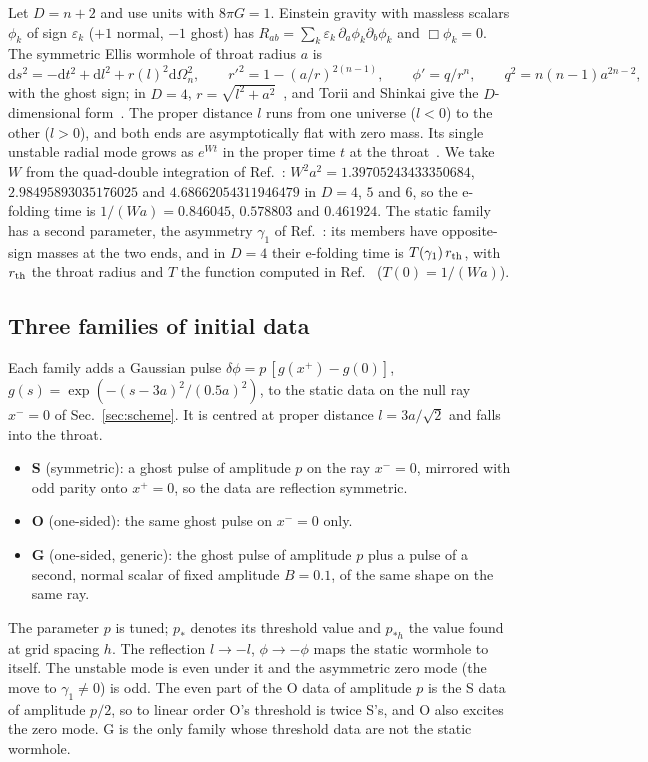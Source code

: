 \documentclass[11pt]{article}
\newcommand{\dd}{\mathrm{d}}
\newcommand{\pst}{p_{*h}}
\begin{document}
Let $D=n+2$ and use units with $8\pi G=1$. Einstein gravity with massless scalars $\phi_k$ of sign $\varepsilon_k$
($+1$ normal, $-1$ ghost) has $R_{ab}=\sum_k\varepsilon_k\,\partial_a\phi_k\partial_b\phi_k$ and $\Box\phi_k=0$. The
symmetric Ellis wormhole of throat radius $a$ is
\begin{equation}
\dd s^2=-\dd t^2+\dd l^2+r(l)^2\dd\Omega_n^2,\qquad r'^2=1-(a/r)^{2(n-1)},\qquad \phi'=q/r^n,\qquad q^2=n(n-1)a^{2n-2},
\label{eq:ellis}
\end{equation}
with the ghost sign; in $D=4$, $r=\sqrt{l^2+a^2}$~\cite{Ellis1973,Bronnikov1973}, and Torii and Shinkai give the
$D$-dimensional form~\cite{TS2013}. The proper distance $l$ runs from one universe ($l<0$) to the other ($l>0$), and
both ends are asymptotically flat with zero mass. Its single unstable radial mode grows as $e^{Wt}$ in the proper time
$t$ at the throat~\cite{GGS2009a,TS2013}. We take $W$ from the quad-double integration of Ref.~\cite{P3}:
$W^2a^2=1.39705243433350684$, $2.98495893035176025$ and $4.68662054311946479$ in $D=4$, $5$ and $6$, so the e-folding
time is $1/(Wa)=0.846045$, $0.578803$ and $0.461924$. The static family has a second parameter, the asymmetry $\gamma_1$
of Ref.~\cite{GGS2009a}: its members have opposite-sign masses at the two ends, and in $D=4$ their e-folding time is
$T(\gamma_1)\,r_{\rm th}$, with $r_{\rm th}$ the throat radius and $T$ the function computed in
Ref.~\cite{GGS2009a} ($T(0)=1/(Wa)$).

\subsection{Three families of initial data}\label{sec:families}

Each family adds a Gaussian pulse $\delta\phi=p\,[g(x^+)-g(0)]$, $g(s)=\exp(-(s-3a)^2/(0.5a)^2)$, to the static data on
the null ray $x^-=0$ of Sec.~\ref{sec:scheme}. It is centred at proper distance $l=3a/\sqrt2$ and falls into the throat.
\begin{itemize}
\item \textbf{S} (symmetric): a ghost pulse of amplitude $p$ on the ray $x^-=0$, mirrored with odd parity onto $x^+=0$,
so the data are reflection symmetric.
\item \textbf{O} (one-sided): the same ghost pulse on $x^-=0$ only.
\item \textbf{G} (one-sided, generic): the ghost pulse of amplitude $p$ plus a pulse of a second, normal scalar of fixed
amplitude $B=0.1$, of the same shape on the same ray.
\end{itemize}
The parameter $p$ is tuned; $p_*$ denotes its threshold value and $\pst$ the value found at grid spacing $h$. The
reflection $l\to-l$, $\phi\to-\phi$ maps the static wormhole to itself. The unstable mode is even under it and the
asymmetric zero mode (the move to $\gamma_1\ne0$) is odd. The even part of the O data of amplitude $p$ is the S data of
amplitude $p/2$, so to linear order O's threshold is twice S's, and O also excites the zero mode. G is the only family whose threshold
data are not the static wormhole.
\end{document}
